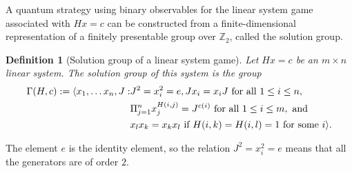 \documentclass[11pt,letterpaper]{article}
\DeclarePairedDelimiter{\ip}{\langle}{\rangle}
\newcommand{\Z}{\mathbb{Z}}
\newcommand{\calH}{\mathcal{H}}
\newcommand{\1}{\mathbb{1}}
\def\carl#1{{\color{blue} #1 -Carl}}
\newcommand{\hf}[1]{\textcolor{red}{#1}}
\newtheorem{definition}[theorem]{Definition}
\theoremstyle{definition}
\begin{document}
A quantum strategy using binary observables for the linear system game associated with $Hx = c$ can be constructed from
a finite-dimensional representation of a finitely presentable group
over $\Z_2$, called the solution group. 
\begin{definition}[Solution group of a linear system game]
	\label{def:presentation}
	Let $Hx = c$ be an $m \times n$ linear system. The solution group of this system
	is the group
	\begin{align*}
		\Gamma(H,c) := \ip{
		x_1,\dots x_n, J: &J^2 = x_i^2 = e, Jx_i = x_iJ \text{ for all }1 \leq i \leq n, \\
				& \Pi_{j=1}^n x_j^{H(i,j)} = J^{c(i)} \text{ for all } 1 \leq i \leq m, \text{ and } \\
				& x_l x_k = x_k x_l \text{ if } H(i,k) = H(i,l) = 1 \text{ for some } i
				}.
	\end{align*}
\end{definition}
The element $e$ is the identity element, so the relation $J^2 = x_i^2 = e$ means that all the generators are 
of order $2$.
\end{document}
